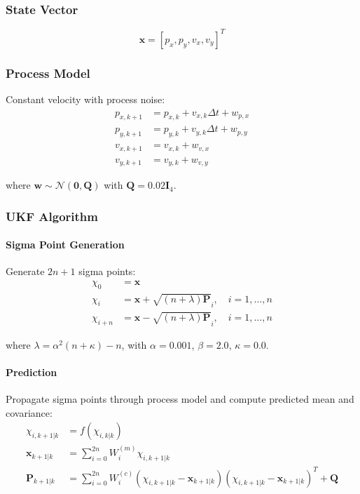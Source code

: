 \documentclass[11pt,a4paper]{article}
\begin{document}
\subsubsection{State Vector}

\begin{equation}
\mathbf{x} = [p_x, p_y, v_x, v_y]^T
\end{equation}

\subsubsection{Process Model}

Constant velocity with process noise:
\begin{align}
p_{x,k+1} &= p_{x,k} + v_{x,k} \Delta t + w_{p,x} \nonumber \\
p_{y,k+1} &= p_{y,k} + v_{y,k} \Delta t + w_{p,y} \nonumber \\
v_{x,k+1} &= v_{x,k} + w_{v,x} \nonumber \\
v_{y,k+1} &= v_{y,k} + w_{v,y} \nonumber
\end{align}

where $\mathbf{w} \sim \mathcal{N}(\mathbf{0}, \mathbf{Q})$ with $\mathbf{Q} = 0.02 \mathbf{I}_4$.

\subsubsection{UKF Algorithm}

\paragraph{Sigma Point Generation}
Generate $2n + 1$ sigma points:
\begin{align}
\chi_0 &= \mathbf{x} \nonumber \\
\chi_i &= \mathbf{x} + \sqrt{(n + \lambda)\mathbf{P}}_i, \quad i = 1, \ldots, n \nonumber \\
\chi_{i+n} &= \mathbf{x} - \sqrt{(n + \lambda)\mathbf{P}}_i, \quad i = 1, \ldots, n \nonumber
\end{align}

where $\lambda = \alpha^2(n + \kappa) - n$, with $\alpha = 0.001$, $\beta = 2.0$, $\kappa = 0.0$.

\paragraph{Prediction}
Propagate sigma points through process model and compute predicted mean and covariance:
\begin{align}
\chi_{i,k+1|k} &= f(\chi_{i,k|k}) \nonumber \\
\mathbf{x}_{k+1|k} &= \sum_{i=0}^{2n} W_i^{(m)} \chi_{i,k+1|k} \nonumber \\
\mathbf{P}_{k+1|k} &= \sum_{i=0}^{2n} W_i^{(c)} (\chi_{i,k+1|k} - \mathbf{x}_{k+1|k})(\chi_{i,k+1|k} - \mathbf{x}_{k+1|k})^T + \mathbf{Q} \nonumber
\end{align}
\end{document}
